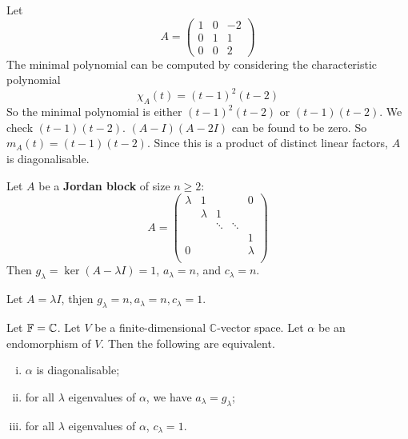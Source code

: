 \documentclass[a4paper]{article}
\begin{document}
\begin{example}
	Let
	\[
		A = \begin{pmatrix}
			1 & 0 & -2 \\
			0 & 1 & 1  \\
			0 & 0 & 2
		\end{pmatrix}
	\]
	The minimal polynomial can be computed by considering the characteristic polynomial
	\[
		\chi_A(t) = (t-1)^2(t-2)
	\]
	So the minimal polynomial is either \( (t-1)^2(t-2) \) or \( (t-1)(t-2) \).
	We check \( (t-1)(t-2) \).
	\( (A - I)(A - 2I) \) can be found to be zero.
	So \( m_A(t) = (t-1)(t-2) \).
	Since this is a product of distinct linear factors, \( A \) is diagonalisable.
\end{example}

\begin{example}
	Let \( A \) be a \textbf{Jordan block} of size \( n \geq 2 \): 
	\[
		A = \begin{pmatrix}
			\lambda & 1 &  &  &  0 \\
			 & \lambda & 1  &  &   \\
			 &  & \ddots & \ddots &   \\
			 &  &  &  & 1  \\
			0 &  &  &  &  \lambda \\
		\end{pmatrix}
	\]
	Then \( g_\lambda = \ker(A-\lambda I) =1 \), \( a_\lambda = n \), and \( c_\lambda = n \).
\end{example}

\begin{example}
	Let $ A = \lambda I $, thjen $ g_\lambda = n, a_\lambda = n, c_\lambda = 1 $. 
\end{example}

\begin{lemma}
	Let \( {\mathbb{F}} = \mathbb C \).
	Let \( V \) be a finite-dimensional \( \mathbb C \)-vector space.
	Let \( \alpha \) be an endomorphism of \( V \).
	Then the following are equivalent.
	\begin{enumerate}[(i)]
		\item \( \alpha \) is diagonalisable;
		\item for all \( \lambda \) eigenvalues of \( \alpha \), we have \( a_\lambda = g_\lambda \);
		\item for all \( \lambda \) eigenvalues of \( \alpha \), \( c_\lambda = 1 \).
	\end{enumerate}
\end{lemma}
\end{document}
